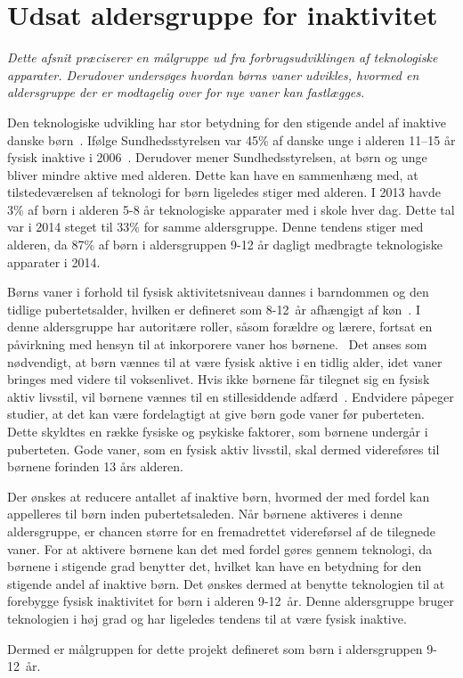 \section{Udsat aldersgruppe for inaktivitet} \label{sec:maalgruppe}
\textit{Dette afsnit præciserer en målgruppe ud fra forbrugsudviklingen af teknologiske apparater. Derudover undersøges hvordan børns vaner udvikles, hvormed en aldersgruppe der er modtagelig over for nye vaner kan fastlægges.}

Den teknologiske udvikling har stor betydning for den stigende andel af inaktive danske børn~\citep{Kiens2007}. Ifølge Sundhedsstyrelsen var 45\% af danske unge i alderen 11–15 år fysisk inaktive i 2006~\citep{Sundhedsstyrelsen2006}. Derudover mener Sundhedsstyrelsen, at børn og unge bliver mindre aktive med alderen. Dette kan have en sammenhæng med, at tilstedeværelsen af teknologi for børn ligeledes stiger med alderen. 
I 2013 havde 3\% af børn i alderen 5-8 år teknologiske apparater med i skole hver dag. Dette tal var i 2014 steget til 33\% for samme aldersgruppe. Denne tendens stiger med alderen, da 87\% af børn i aldersgruppen 9-12 år dagligt medbragte teknologiske apparater i 2014.~\citep{Sundhedsstyrelsen2006,GjensidigeForsikring2014} 

Børns vaner i forhold til fysisk aktivitetsniveau dannes i barndommen og den tidlige pubertetsalder, hvilken er defineret som 8-12~år afhængigt af køn~\citep{Wied2011}. I denne aldersgruppe har autoritære roller, såsom forældre og lærere, fortsat en påvirkning med hensyn til at inkorporere vaner hos børnene.~\citep{Wied2011,F.SallisG.Simons-MortonJ.Stone1992,L.MeyerP.Gullotta2012} \newline
Det anses som nødvendigt, at børn vænnes til at være fysisk aktive i en tidlig alder, idet vaner bringes med videre til voksenlivet. Hvis ikke børnene får tilegnet sig en fysisk aktiv livsstil, vil børnene vænnes til en stillesiddende adfærd~\citep{Nabe-NielsenSundhedsministerietetal.2005}. Endvidere påpeger studier, at det kan være fordelagtigt at give børn gode vaner før puberteten. Dette skyldtes en række fysiske og psykiske faktorer, som børnene undergår i puberteten. Gode vaner, som en fysisk aktiv livsstil, skal dermed videreføres til børnene forinden 13 års alderen.~\citep{F.SallisG.Simons-MortonJ.Stone1992,L.MeyerP.Gullotta2012,P.J.KremersBrug2008}

Der ønskes at reducere antallet af inaktive børn, hvormed der med fordel kan appelleres til børn inden pubertetsaleden. Når børnene aktiveres i denne aldersgruppe, er chancen større for en fremadrettet videreførsel af de tilegnede vaner. For at aktivere børnene kan det med fordel gøres gennem teknologi, da børnene i stigende grad benytter det, hvilket kan have en betydning for den stigende andel af inaktive børn. Det ønskes dermed at benytte teknologien til at forebygge fysisk inaktivitet for børn i alderen 9-12~år. Denne aldersgruppe bruger teknologien i høj grad og har ligeledes tendens til at være fysisk inaktive. 

Dermed er målgruppen for dette projekt defineret som børn i aldersgruppen 9-12~år.